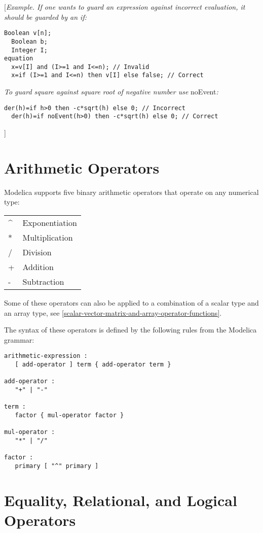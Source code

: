 {[}\emph{Example. If one wants to guard an expression against incorrect
evaluation, it should be guarded by an if:}

\begin{lstlisting}[language=modelica]
  Boolean v[n];
  Boolean b;
  Integer I;
equation
  x=v[I] and (I>=1 and I<=n); // Invalid
  x=if (I>=1 and I<=n) then v[I] else false; // Correct
\end{lstlisting}

\emph{To guard square against square root of negative number use}
noEvent\emph{:}
\begin{lstlisting}[language=modelica]
  der(h)=if h>0 then -c*sqrt(h) else 0; // Incorrect
  der(h)=if noEvent(h>0) then -c*sqrt(h) else 0; // Correct
\end{lstlisting}
{]}

\section{Arithmetic Operators}

Modelica supports five binary arithmetic operators that operate on any
numerical type:

\begin{longtable}[c]{ll}
\^{} & Exponentiation\\
* & Multiplication\\ 
/ & Division\\ 
+ & Addition\\ 
- & Subtraction\\
\end{longtable}

Some of these operators can also be applied to a combination of a scalar
type and an array type, see \autoref{scalar-vector-matrix-and-array-operator-functions}.

The syntax of these operators is defined by the following rules from the
Modelica grammar:

\begin{lstlisting}[language=grammar]
arithmetic-expression :
   [ add-operator ] term { add-operator term }

add-operator :
   "+" | "-"
   
term :
   factor { mul-operator factor }

mul-operator :
   "*" | "/"
   
factor :
   primary [ "^" primary ]
\end{lstlisting}

\section{Equality, Relational, and Logical Operators}

